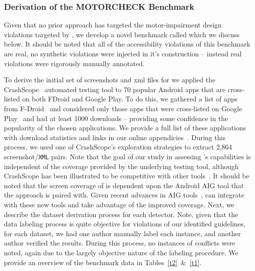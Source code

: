 \subsubsection{Derivation of the M{\normalsize OTOR}C{\normalsize HECK} Benchmark}
\label{subsec:dataset}

Given that no prior approach has targeted the motor-impairment design violations targeted by \MotorEase, we develop a novel benchmark called \MotorCheck which we discuss below. It should be noted that all of the accessibility violations of this benchmark are real, no synthetic violations were injected in it's construction -- instead real violations were rigorously manually annotated.

To derive the initial set of screenshots and xml files for \MotorCheck we applied the {\sc CrashScope}~\cite{crashscope} automated testing tool to 70 popular Android apps that are cross-listed on both FDroid and Google Play. To do this, we gathered a list of apps from F-Droid~\cite{Fdroid} and considered only those apps that were cross-listed on Google Play~\cite{GooglePlayStore} and had at least 1000 downloads -- providing some confidence in the popularity of the chosen applications. We provide a full list of these applications with download statistics and links in our online appendicies~\cite{appendix,site,zenodo}. During this process, we used one of {\sc CrashScope}'s exploration strategies to extract 2,864 screenshot/\texttt{\small XML} pairs. Note that the goal of our study in assessing \MotorEase's capabilities is independent of the coverage provided by the underlying testing tool, although {\sc CrashScope} has been illustrated to be competitive with other tools~\cite{Moran:ICST'16}. It should be noted that the screen coverage of \MotorEase is dependent upon the Android AIG tool that the approach is paired with. Given recent advances in AIG tools~\cite{wang_vet_2021}, \MotorEase can integrate with these new tools and take advantage of the improved coverage. Next, we describe the dataset derivation process for each detector. Note, given that the data labeling process is quite objective for violations of our identified guidelines, for each dataset, we had one author manually label each instance, and another author verified the results. During this process, no instances of conflicts were noted, again due to the largely objective nature of the labeling procedure. We provide an overview of the \MotorCheck benchmark data in Tables~\ref{t2}~\&~\ref{t1}.


